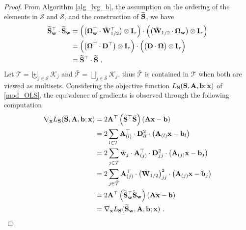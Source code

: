 \documentclass[journal,letterpaper,onecolumn,twoside,nofonttune]{IEEEtran}
\newcommand{\K}{\mathcal{K}}
\newcommand{\Scal}{\mathcal{S}}
\newcommand{\Tcal}{\mathcal{T}}
\newcommand{\Sbar}{\bar{\mathcal{S}}}
\newcommand{\Tbar}{\bar{\mathcal{T}}}
\newcommand{\bb}{\bold{b}}
\newcommand{\xb}{\bold{x}}
\newcommand{\Ab}{\bold{A}}
\newcommand{\Db}{\bold{D}}
\newcommand{\Ib}{\bold{I}}
\newcommand{\Sb}{\bold{S}}
\newcommand{\Sbwt}{\widetilde{\Sb}}
\newcommand{\Sbw}{\Sbwt_{\wb}}
\newcommand{\wb}{\bold{w}}
\newcommand{\Wb}{\bold{W}}
\newcommand{\Omb}{\bold{\Omega}}
\newcommand{\Ombw}{\Omb_{\wb}}
\newcommand{\wbt}{\tilde{\wb}}
\newcommand{\Wbt}{\tilde{\Wb}}
\newcommand{\diag}{\mathrm{diag}}
\begin{document}
\begin{proof}
From Algorithm \ref{alg_lvg_b}, the assumption on the ordering of the elements in $\Scal$ and $\Sbar$, and the construction of $\Sbwt$, we have
\begin{align*}
  \Sbw^\top\cdot\Sbw &=  \Big(\big(\Ombw^\top\cdot\Wbt_{1/2}^\top\big)\otimes\Ib_\tau\Big) \cdot \Big(\big(\Wbt_{1/2}\cdot\Ombw\big)\otimes\Ib_\tau\Big)\\
  &= \Big(\big(\Omb^\top\cdot\Db^\top\big)\otimes\Ib_\tau\Big) \cdot \Big(\big(\Db\cdot\Omb\big)\otimes\Ib_\tau\Big)\\
  &= \Sbwt^\top\cdot\Sbwt \ .
\end{align*}
Let $\Tcal=\biguplus_{j\in\Scal}\K_j$ and $\Tbar=\bigsqcup_{j\in\Sbar}\K_j$, thus $\Tbar$ is contained in $\Tcal$ when both are viewed as multisets. Considering the objective function $L_\Sb(\Sb,\Ab,\bb;\xb)$ of \eqref{mod_OLS}, the equivalence of gradients is observed through the following computation%
\begin{align*}
  \nabla_{\xb}L_\Sb(\Sbwt,\Ab,\bb;\xb) &= 2\Ab^\top\left(\Sbwt^\top\Sbwt\right)\left(\Ab\xb-\bb\right)\\
  &= 2\sum\limits_{l\in\Tcal}\Ab_{(l)}^\top \cdot\Db_{ll}^2 \cdot  \left(\Ab_{(l)}\xb-\bb_l\right)\\
  &= 2\sum\limits_{j\in\Tbar}\wbt_j\cdot\Ab_{(j)}^\top \cdot\Db_{jj}^2 \cdot  \left(\Ab_{(j)}\xb-\bb_j\right)\\
  &= 2\sum\limits_{j\in\Tbar}\Ab_{(j)}^\top \cdot\big(\Wbt_{1/2}\big)_{jj}^2 \cdot  \left(\Ab_{(j)}\xb-\bb_j\right)\\
  &= 2\Ab^\top\left(\Sbw^\top\Sbw\right)\left(\Ab\xb-\bb\right)\\
  &= \nabla_{\xb}L_\Sb(\Sbw,\Ab,\bb;\xb)\ .
\end{align*}


\end{proof}
\end{document}
